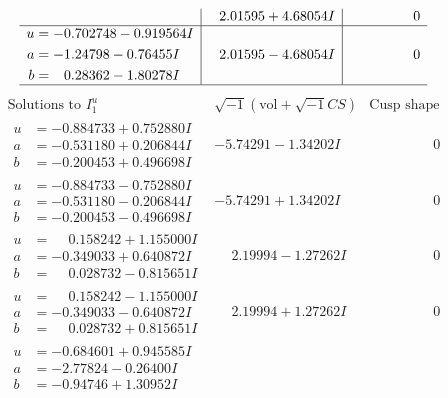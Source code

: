 \documentclass[1p]{elsarticle_modified}
\theoremstyle{definition}
\newcommand{\I}{\sqrt{-1}}
\begin{document}
$$\begin{array}{c|c|c}
 & \phantom{-}2.01595 + 4.68054 I & \phantom{-0.000000 } 0 \\ \hline\begin{aligned}
u &= -0.702748 - 0.919564 I \\
a &= -1.24798 - 0.76455 I \\
b &= \phantom{-}0.28362 - 1.80278 I\end{aligned}
 & \phantom{-}2.01595 - 4.68054 I & \phantom{-0.000000 } 0\\
 \hline 
 \end{array}$$\newpage$$\begin{array}{c|c|c}  
\text{Solutions to }I^u_{1}& \I (\text{vol} + \sqrt{-1}CS) & \text{Cusp shape}\\
 \hline 
\begin{aligned}
u &= -0.884733 + 0.752880 I \\
a &= -0.531180 + 0.206844 I \\
b &= -0.200453 + 0.496698 I\end{aligned}
 & -5.74291 - 1.34202 I & \phantom{-0.000000 } 0 \\ \hline\begin{aligned}
u &= -0.884733 - 0.752880 I \\
a &= -0.531180 - 0.206844 I \\
b &= -0.200453 - 0.496698 I\end{aligned}
 & -5.74291 + 1.34202 I & \phantom{-0.000000 } 0 \\ \hline\begin{aligned}
u &= \phantom{-}0.158242 + 1.155000 I \\
a &= -0.349033 + 0.640872 I \\
b &= \phantom{-}0.028732 - 0.815651 I\end{aligned}
 & \phantom{-}2.19994 - 1.27262 I & \phantom{-0.000000 } 0 \\ \hline\begin{aligned}
u &= \phantom{-}0.158242 - 1.155000 I \\
a &= -0.349033 - 0.640872 I \\
b &= \phantom{-}0.028732 + 0.815651 I\end{aligned}
 & \phantom{-}2.19994 + 1.27262 I & \phantom{-0.000000 } 0 \\ \hline\begin{aligned}
u &= -0.684601 + 0.945585 I \\
a &= -2.77824 - 0.26400 I \\
b &= -0.94746 + 1.30952 I\end{aligned}

\end{array}$$
\end{document}

